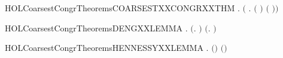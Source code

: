 \newcommand{\HOLCoarsestCongrTheoremsCOARSESTXXCONGRXXRL}{\UseVerbatim{HOLCoarsestCongrTheoremsCOARSESTXXCONGRXXRL}}
\begin{SaveVerbatim}{HOLCoarsestCongrTheoremsCOARSESTXXCONGRXXTHM}
\HOLTokenTurnstile{} \HOLSymConst{\HOLTokenForall{}} .
         \HOLSymConst{\HOLTokenConj{}}   \HOLSymConst{\HOLTokenImp{}}
       \ensuremath{(}   \HOLSymConst{\HOLTokenEquiv{}} \HOLSymConst{\HOLTokenForall{}}.  \ensuremath{(} \HOLSymConst{\ensuremath{+}} \ensuremath{)} \ensuremath{(} \HOLSymConst{\ensuremath{+}} \ensuremath{)}\ensuremath{)}
\end{SaveVerbatim}
\newcommand{\HOLCoarsestCongrTheoremsCOARSESTXXCONGRXXTHM}{\UseVerbatim{HOLCoarsestCongrTheoremsCOARSESTXXCONGRXXTHM}}
\begin{SaveVerbatim}{HOLCoarsestCongrTheoremsDENGXXLEMMA}
\HOLTokenTurnstile{} \HOLSymConst{\HOLTokenForall{}} .
          \HOLSymConst{\HOLTokenImp{}}
       \ensuremath{(}\HOLSymConst{\HOLTokenExists{}}.  \HOLTokenTransBegin\HOLConst{\ensuremath{\tau}}\HOLTokenTransEnd {} \HOLSymConst{\HOLTokenConj{}}   \ensuremath{)} \HOLSymConst{\HOLTokenDisj{}}
       \ensuremath{(}\HOLSymConst{\HOLTokenExists{}}.  \HOLTokenTransBegin\HOLConst{\ensuremath{\tau}}\HOLTokenTransEnd {} \HOLSymConst{\HOLTokenConj{}}   \ensuremath{)} \HOLSymConst{\HOLTokenDisj{}}   
\end{SaveVerbatim}
\newcommand{\HOLCoarsestCongrTheoremsDENGXXLEMMA}{\UseVerbatim{HOLCoarsestCongrTheoremsDENGXXLEMMA}}
\begin{SaveVerbatim}{HOLCoarsestCongrTheoremsHENNESSYXXLEMMA}
\HOLTokenTurnstile{} \HOLSymConst{\HOLTokenForall{}} .
          \HOLSymConst{\HOLTokenEquiv{}}
          \HOLSymConst{\HOLTokenDisj{}}   \ensuremath{(}\HOLConst{\ensuremath{\tau}}\HOLSymConst{\ensuremath{\ldotp}}\ensuremath{)} \HOLSymConst{\HOLTokenDisj{}}  \ensuremath{(}\HOLConst{\ensuremath{\tau}}\HOLSymConst{\ensuremath{\ldotp}}\ensuremath{)} 
\end{SaveVerbatim}
